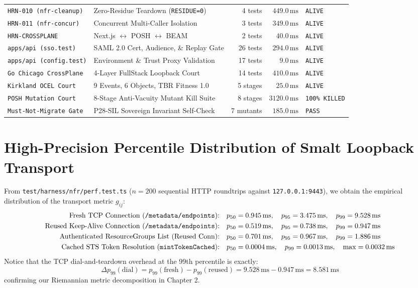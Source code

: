 \documentclass[10pt,twoside,openany]{book}
\theoremstyle{plain}
\theoremstyle{definition}
\theoremstyle{remark}
\begin{document}
\begin{longtable}{llrrl}
\texttt{HRN-010 (nfr-cleanup)} & Zero-Residue Teardown (\texttt{RESIDUE=0}) & 4 tests & $449.0\,\mathrm{ms}$ & \texttt{ALIVE} \\
\texttt{HRN-011 (nfr-concur)} & Concurrent Multi-Caller Isolation & 3 tests & $349.0\,\mathrm{ms}$ & \texttt{ALIVE} \\
\texttt{HRN-CROSSPLANE} & Next.js $\leftrightarrow$ POSH $\leftrightarrow$ BEAM & 2 tests & $40.0\,\mathrm{ms}$ & \texttt{ALIVE} \\
\texttt{apps/api (sso.test)} & SAML 2.0 Cert, Audience, \& Replay Gate & 26 tests & $294.0\,\mathrm{ms}$ & \texttt{ALIVE} \\
\texttt{apps/api (config.test)} & Environment \& Trust Proxy Validation & 17 tests & $9.0\,\mathrm{ms}$ & \texttt{ALIVE} \\
\texttt{Go Chicago CrossPlane} & 4-Layer FullStack Loopback Court & 14 tests & $410.0\,\mathrm{ms}$ & \texttt{ALIVE} \\
\texttt{Kirkland OCEL Court} & 9 Events, 6 Objects, TBR Fitness 1.0 & 5 stages & $25.0\,\mathrm{ms}$ & \texttt{ALIVE} \\
\texttt{POSH Mutation Court} & 8-Stage Anti-Vacuity Mutant Kill Suite & 8 stages & $3120.0\,\mathrm{ms}$ & \texttt{100\% KILLED} \\
\texttt{Must-Not-Migrate Gate} & P28-SIL Sovereign Invariant Self-Check & 7 mutants & $185.0\,\mathrm{ms}$ & \texttt{PASS} \\
\end{longtable}

\section{High-Precision Percentile Distribution of Smalt Loopback Transport}
From \texttt{test/harness/nfr/perf.test.ts} ($n = 200$ sequential HTTP roundtrips against \texttt{127.0.0.1:9443}), we obtain the empirical distribution of the transport metric $g_{ij}$:
\begin{align}
\text{Fresh TCP Connection (\texttt{/metadata/endpoints}):} \quad & p_{50} = 0.945\,\mathrm{ms}, \quad p_{95} = 3.475\,\mathrm{ms}, \quad p_{99} = 9.528\,\mathrm{ms} \\
\text{Reused Keep-Alive Connection (\texttt{/metadata/endpoints}):} \quad & p_{50} = 0.519\,\mathrm{ms}, \quad p_{95} = 0.738\,\mathrm{ms}, \quad p_{99} = 0.947\,\mathrm{ms} \\
\text{Authenticated ResourceGroups List (Reused Conn):} \quad & p_{50} = 0.701\,\mathrm{ms}, \quad p_{95} = 0.967\,\mathrm{ms}, \quad p_{99} = 1.886\,\mathrm{ms} \\
\text{Cached STS Token Resolution (\texttt{mintTokenCached}):} \quad & p_{50} = 0.0004\,\mathrm{ms}, \quad p_{99} = 0.0013\,\mathrm{ms}, \quad \max = 0.0032\,\mathrm{ms}
\end{align}
Notice that the TCP dial-and-teardown overhead at the 99th percentile is exactly:
\begin{equation}
\Delta p_{99}(\mathrm{dial}) = p_{99}(\mathrm{fresh}) - p_{99}(\mathrm{reused}) = 9.528\,\mathrm{ms} - 0.947\,\mathrm{ms} = 8.581\,\mathrm{ms}
\end{equation}
confirming our Riemannian metric decomposition in Chapter 2.
\end{document}
